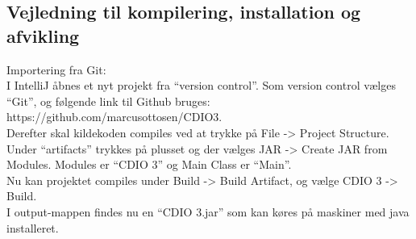 \subsection{Vejledning til kompilering, installation og afvikling}
Importering fra Git: \\
I IntelliJ åbnes et nyt projekt fra “version control”. Som version control vælges “Git”, og følgende link til Github bruges:
https://github.com/marcusottosen/CDIO3. \\
Derefter skal kildekoden compiles ved at trykke på File -> Project Structure. \\
Under “artifacts” trykkes på plusset og der vælges JAR -> Create JAR from Modules.
Modules er “CDIO 3” og Main Class er “Main”.\\

Nu kan projektet compiles under Build -> Build Artifact, og vælge CDIO 3 -> Build. \\
I output-mappen findes nu en “CDIO 3.jar” som kan køres på maskiner med java installeret. \cite{CDIO2}